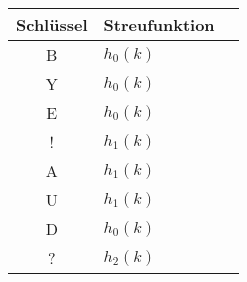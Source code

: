 \documentclass{lehramt-informatik-aufgabe}
\begin{document}
\begin{enumerate}
\begin{liAntwort}
\begin{center}
\begin{tabular}{|c||l|l|}
\hline
Schlüssel & Streufunktion\\
\hline
B & $h_0(k)$ \\
Y & $h_0(k)$ \\
E & $h_0(k)$ \\
! & $h_1(k)$ \\
A & $h_1(k)$ \\
U & $h_1(k)$ \\
D & $h_0(k)$ \\
? & $h_2(k)$ \\
\hline
\end{tabular}
\end{center}
\end{liAntwort}

\end{enumerate}
\end{document}
